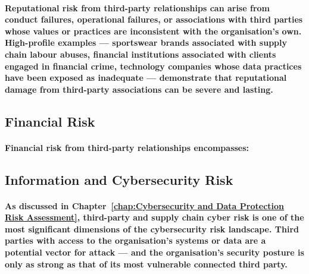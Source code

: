 \paragraph{\textbf{Reputational risk} from third-party relationships can arise from conduct failures, operational failures, or associations with third parties whose values or practices are inconsistent with the organisation's own. High-profile examples — sportswear brands associated with supply chain labour abuses, financial institutions associated with clients engaged in financial crime, technology companies whose data practices have been exposed as inadequate — demonstrate that reputational damage from third-party associations can be severe and lasting.}

\subsection{Financial Risk}
\paragraph{Financial risk from third-party relationships encompasses:}
\begin{itemize}
\end{itemize}

\subsection{Information and Cybersecurity Risk}
\paragraph{As discussed in Chapter~\ref{chap:Cybersecurity and Data Protection Risk Assessment}, third-party and supply chain cyber risk is one of the most significant dimensions of the cybersecurity risk landscape. Third parties with access to the organisation's systems or data are a potential vector for attack — and the organisation's security posture is only as strong as that of its most vulnerable connected third party.}

